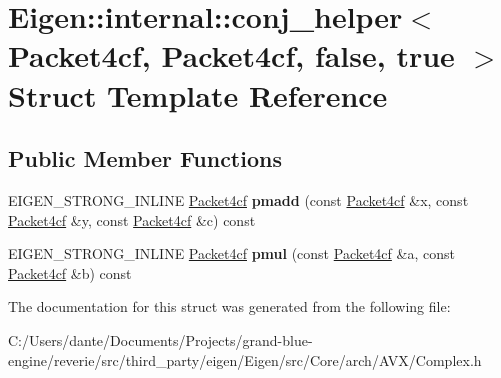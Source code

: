 \hypertarget{struct_eigen_1_1internal_1_1conj__helper_3_01_packet4cf_00_01_packet4cf_00_01false_00_01true_01_4}{}\section{Eigen\+::internal\+::conj\+\_\+helper$<$ Packet4cf, Packet4cf, false, true $>$ Struct Template Reference}
\label{struct_eigen_1_1internal_1_1conj__helper_3_01_packet4cf_00_01_packet4cf_00_01false_00_01true_01_4}
\subsection*{Public Member Functions}
\begin{DoxyCompactItemize}
\item 
\mbox{\label{struct_eigen_1_1internal_1_1conj__helper_3_01_packet4cf_00_01_packet4cf_00_01false_00_01true_01_4_a6d6a6ef4f67a8efd530debc6e9009222}} 
E\+I\+G\+E\+N\+\_\+\+S\+T\+R\+O\+N\+G\+\_\+\+I\+N\+L\+I\+NE \mbox{\hyperlink{struct_eigen_1_1internal_1_1_packet4cf}{Packet4cf}} {\bfseries pmadd} (const \mbox{\hyperlink{struct_eigen_1_1internal_1_1_packet4cf}{Packet4cf}} \&x, const \mbox{\hyperlink{struct_eigen_1_1internal_1_1_packet4cf}{Packet4cf}} \&y, const \mbox{\hyperlink{struct_eigen_1_1internal_1_1_packet4cf}{Packet4cf}} \&c) const
\item 
\mbox{\label{struct_eigen_1_1internal_1_1conj__helper_3_01_packet4cf_00_01_packet4cf_00_01false_00_01true_01_4_a19ff6d80791dd7ee3efa068187c4f6d4}} 
E\+I\+G\+E\+N\+\_\+\+S\+T\+R\+O\+N\+G\+\_\+\+I\+N\+L\+I\+NE \mbox{\hyperlink{struct_eigen_1_1internal_1_1_packet4cf}{Packet4cf}} {\bfseries pmul} (const \mbox{\hyperlink{struct_eigen_1_1internal_1_1_packet4cf}{Packet4cf}} \&a, const \mbox{\hyperlink{struct_eigen_1_1internal_1_1_packet4cf}{Packet4cf}} \&b) const
\end{DoxyCompactItemize}


The documentation for this struct was generated from the following file\+:\begin{DoxyCompactItemize}
\item 
C\+:/\+Users/dante/\+Documents/\+Projects/grand-\/blue-\/engine/reverie/src/third\+\_\+party/eigen/\+Eigen/src/\+Core/arch/\+A\+V\+X/Complex.\+h\end{DoxyCompactItemize}
